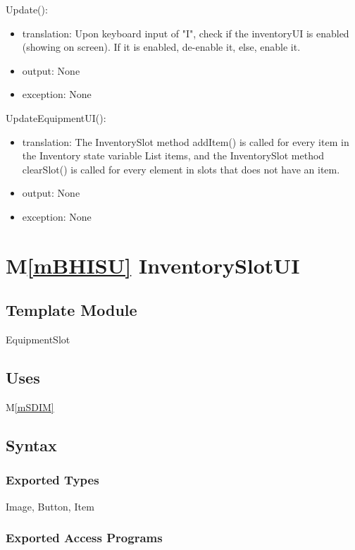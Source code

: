 \documentclass[12pt]{article}
\newcommand{\mref}[1]{M\ref{#1}}
\begin{document}
\noindent Update():
\begin{itemize}
\item translation: Upon keyboard input of "I", check if the inventoryUI is enabled (showing on screen). If it is enabled, de-enable it, else, enable it.
\item output: None
\item exception: None
\end{itemize}

\noindent UpdateEquipmentUI():
\begin{itemize}
\item translation: The InventorySlot method addItem() is called for every item in the Inventory state variable List items, and the InventorySlot method clearSlot() is called for every element in slots that does not have an item.
\item output: None
\item exception: None
\end{itemize}

\newpage

\section* {\mref{mBHISU} InventorySlotUI}

\subsection*{Template Module}

EquipmentSlot

\subsection* {Uses}

\mref{mSDIM}

\subsection* {Syntax}

\subsubsection* {Exported Types}

Image, Button, Item

\subsubsection* {Exported Access Programs}
\end{document}

